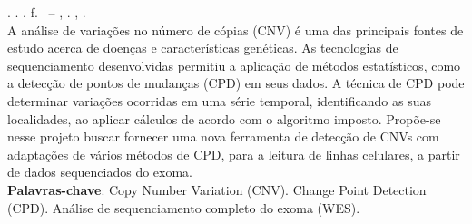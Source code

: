 
\begin{resumo}[RESUMO]
\begin{SingleSpacing}

\imprimirautorcitacao. \imprimirtitulo. \imprimirdata. \pageref {LastPage} f. \imprimirprojeto\ – \imprimirprograma, \imprimirinstituicao. \imprimirlocal, \imprimirdata.\\


A análise de variações no número de cópias (CNV) é uma das principais fontes de estudo acerca de doenças e características genéticas. As tecnologias de sequenciamento desenvolvidas permitiu a aplicação de métodos estatísticos, como a detecção de pontos de mudanças (CPD) em seus dados. A técnica de CPD pode determinar variações ocorridas em uma série temporal, identificando as suas localidades, ao aplicar cálculos de acordo com o algoritmo imposto. Propõe-se nesse projeto buscar fornecer uma nova ferramenta de detecção de CNVs com adaptações de vários métodos de CPD, para a leitura de linhas celulares, a partir de dados sequenciados do exoma. \\

\textbf{Palavras-chave}: Copy Number Variation (CNV). Change Point Detection (CPD). Análise de sequenciamento completo do exoma (WES).

\end{SingleSpacing}
\end{resumo}

